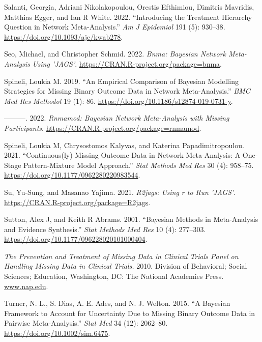 \begin{CSLReferences}{1}{0}
\leavevmode{}%
Salanti, Georgia, Adriani Nikolakopoulou, Orestis Efthimiou, Dimitris Mavridis, Matthias Egger, and Ian R White. 2022. {``Introducing the Treatment Hierarchy Question in Network Meta-Analysis.''} \emph{Am J Epidemiol} 191 (5): 930--38. \url{https://doi.org/10.1093/aje/kwab278}.

\leavevmode{}%
Seo, Michael, and Christopher Schmid. 2022. \emph{Bnma: Bayesian Network Meta-Analysis Using 'JAGS'}. \url{https://CRAN.R-project.org/package=bnma}.

\leavevmode{}%
Spineli, Loukia M. 2019. {``An Empirical Comparison of Bayesian Modelling Strategies for Missing Binary Outcome Data in Network Meta-Analysis.''} \emph{BMC Med Res Methodol} 19 (1): 86. \url{https://doi.org/10.1186/s12874-019-0731-y}.

\leavevmode{}%
---------. 2022. \emph{Rnmamod: Bayesian Network Meta-Analysis with Missing Participants}. \url{https://CRAN.R-project.org/package=rnmamod}.

\leavevmode{}%
Spineli, Loukia M, Chrysostomos Kalyvas, and Katerina Papadimitropoulou. 2021. {``Continuous(ly) Missing Outcome Data in Network Meta-Analysis: A One-Stage Pattern-Mixture Model Approach.''} \emph{Stat Methods Med Res} 30 (4): 958--75. \url{https://doi.org/10.1177/0962280220983544}.

\leavevmode{}%
Su, Yu-Sung, and Masanao Yajima. 2021. \emph{R2jags: Using r to Run 'JAGS'}. \url{https://CRAN.R-project.org/package=R2jags}.

\leavevmode{}%
Sutton, Alex J, and Keith R Abrams. 2001. {``Bayesian Methods in Meta-Analysis and Evidence Synthesis.''} \emph{Stat Methods Med Res} 10 (4): 277--303. \url{https://doi.org/10.1177/096228020101000404}.

\leavevmode{}%
\emph{The Prevention and Treatment of Missing Data in Clinical Trials Panel on Handling Missing Data in Clinical Trials.} 2010. Division of Behavioral; Social Sciences; Education, Washington, DC: The National Academies Press. \href{https://www.nap.edu}{www.nap.edu}.

\leavevmode{}%
Turner, N. L., S. Dias, A. E. Ades, and N. J. Welton. 2015. {``A Bayesian Framework to Account for Uncertainty Due to Missing Binary Outcome Data in Pairwise Meta-Analysis.''} \emph{Stat Med} 34 (12): 2062--80. \url{https://doi.org/10.1002/sim.6475}.


\end{CSLReferences}
